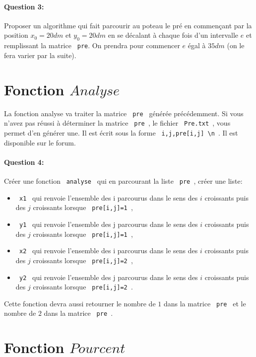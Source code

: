 \paragraph{Question 3:} Proposer un algorithme qui fait parcourir au poteau le pré en commençant par la position $x_0=20dm$ et $y_0=20dm$ en se décalant à chaque fois d'un intervalle $e$ et remplissant la matrice \verb? pre?. On prendra pour commencer $e$ égal à $35dm$ (on le fera varier par la suite).

\section{Fonction $Analyse$}

La fonction analyse va traiter la matrice \verb? pre ? générée précédemment. Si vous n'avez pas réussi à déterminer la matrice \verb? pre ?, le fichier \verb? Pre.txt ?, vous permet d'en générer une. Il est écrit sous la forme \verb? i,j,pre[i,j] \n ?. Il est disponible sur le forum.

\paragraph{Question 4:} Créer une fonction \verb? analyse ? qui en parcourant la liste \verb? pre ?, créer une liste:
\begin{itemize}
 \item \verb? x1 ? qui renvoie l'ensemble des i parcourus dans le sens des $i$ croissants puis des $j$ croissants lorsque \verb? pre[i,j]=1 ?,
 \item \verb? y1 ? qui renvoie l'ensemble des j parcourus dans le sens des $i$ croissants puis des $j$ croissants lorsque \verb? pre[i,j]=1 ?,
 \item \verb? x2 ? qui renvoie l'ensemble des i parcourus dans le sens des $i$ croissants puis des $j$ croissants lorsque \verb? pre[i,j]=2 ?,
 \item \verb? y2 ? qui renvoie l'ensemble des j parcourus dans le sens des $i$ croissants puis des $j$ croissants lorsque \verb? pre[i,j]=2 ?.
\end{itemize}

Cette fonction devra aussi retourner le nombre de $1$ dans la matrice \verb? pre ? et le nombre de $2$ dans la matrice \verb? pre ?.

\section{Fonction $Pourcent$}

